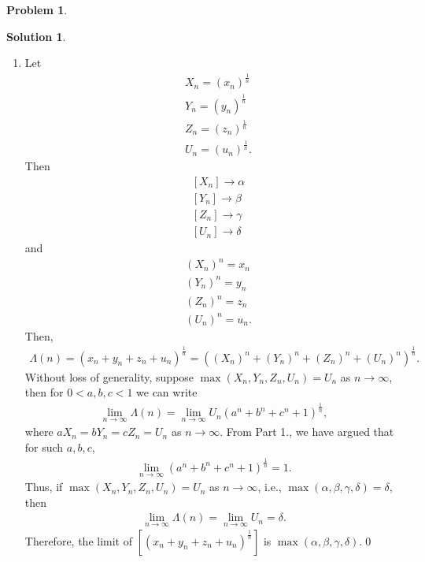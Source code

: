\documentclass{article}
\theoremstyle{definition}
\newtheorem*{prob*}{Problem}
\newtheorem*{sln*}{Solution}
\begin{document}
\begin{prob*}
\begin{sln*}
\begin{enumerate}
\begin{enumerate}
				\item Let
				\begin{align*}
				&X_n = (x_n)^{\frac{1}{n}}\\
				&Y_n = (y_n)^{\frac{1}{n}}\\
				&Z_n = (z_n)^{\frac{1}{n}}\\
				&U_n = (u_n)^{\frac{1}{n}}.
				\end{align*}
				Then
				\begin{align*}
				& \left[ X_n  \right] \longrightarrow \alpha\\
				& \left[ Y_n  \right] \longrightarrow \beta\\
				& \left[ Z_n \right] \longrightarrow \gamma\\
				& \left[ U_n \right] \longrightarrow \delta
				\end{align*}
				and
				\begin{align*}
				&(X_n)^n = x_n\\
				&(Y_n)^n = y_n\\
				&(Z_n)^n = z_n\\
				&(U_n)^n = u_n.
				\end{align*}
				Then,
				\begin{align*}
				\Lambda(n) =  (x_n + y_n + z_n + u_n)^{\frac{1}{n}} = \left((X_n)^n + (Y_n)^n + (Z_n)^n + (U_n)^n\right)^{\frac{1}{n}}.
				\end{align*}
				Without loss of generality, suppose $\max(X_n ,Y_n, Z_n, U_n) = U_n$ as $n\to\infty$, then for $0 <a,b,c < 1$ we can write
				\begin{align*}
				\lim\limits_{n\to\infty} \Lambda(n)= \lim\limits_{n\to\infty} U_n \left( a^n + b^n + c^n + 1\right)^{\frac{1}{n}},
				\end{align*}
				where $aX_n = bY_n = cZ_n = U_n$ as $n\to\infty$. From Part 1., we have argued that for such $a,b,c$, 
				\begin{align*}
				\lim\limits_{n\to\infty}\left( a^n + b^n + c^n + 1\right)^{\frac{1}{n}} = 1.
				\end{align*} 
				Thus, if $\max(X_n ,Y_n, Z_n, U_n) = U_n$ as $n\to\infty$, i.e., $\max(\alpha,\beta,\gamma,\delta) = \delta$, then 
				\begin{align*}
				\lim\limits_{n\to\infty}\Lambda(n) = \lim\limits_{n\to\infty}U_n = \delta. 
				\end{align*}
				Therefore, the limit of $\left[ (x_n + y_n + z_n + u_n)^{\frac{1}{n}} \right]$ is $\max(\alpha,\beta,\gamma,\delta)$.\qed
			\end{enumerate}
		

\end{enumerate}
\end{sln*}
\end{prob*}
\end{document}
